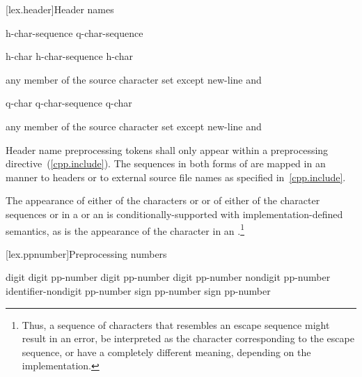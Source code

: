 [lex.header]{Header names}

%
\begin{bnf}
\br
    \terminal{<} h-char-sequence \terminal{>}\br
     q-char-sequence 
\end{bnf}

\begin{bnf}
\br
    h-char\br
    h-char-sequence h-char
\end{bnf}

\begin{bnf}
\br
    \textnormal{any member of the source character set except new-line and \terminal{>}}
\end{bnf}

\begin{bnf}
\br
    q-char\br
    q-char-sequence q-char
\end{bnf}

\begin{bnf}
\br
    \textnormal{any member of the source character set except new-line and }
\end{bnf}

\pnum
Header name preprocessing tokens shall only appear within a
 preprocessing directive~(\ref{cpp.include}). The
sequences in both forms of  are mapped in an
 manner to headers or to
external source file names as specified in~\ref{cpp.include}.

\pnum
The appearance of either of the characters  or \tcode{\textbackslash} or of
either of the character sequences \tcode{/*} or \tcode{//} in a
 or an 
is conditionally-supported with implementation-defined semantics,
as is the appearance of the
character  in an .\footnote{Thus, a
sequence of characters that resembles an escape sequence might result in an
error, be interpreted as the character corresponding to the escape sequence, or
have a completely different meaning, depending on the implementation.}%

[lex.ppnumber]{Preprocessing numbers}

%
\begin{bnf}
\br
    digit\br
     digit\br
    pp-number digit\br
    pp-number  digit\br
    pp-number  nondigit\br
    pp-number identifier-nondigit\br
    pp-number  sign\br
    pp-number  sign\br
    pp-number 
\end{bnf}

